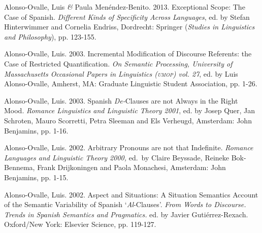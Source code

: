 \documentclass[11pt]{article}
\begin{document}
Alonso-Ovalle, Luis \textit{\&} Paula Men\'endez-Benito. 2013. Exceptional Scope: The Case of Spanish. \textit{Different Kinds of Specificity Across Languages}, ed. by
Stefan Hinterwimmer and Cornelia Endriss, Dordrecht: Springer
(\textit{Studies in Linguistics and Philosophy}), pp. 123-155.

Alonso-Ovalle, Luis. 2003. Incremental Modification of Discourse Referents: the Case of Restricted Quantification. \textit{On Semantic Processing, University of Massachusetts Occasional Papers in Linguistics (\textsc{umop}) vol. 27}, ed. by Luis Alonso-Ovalle, Amherst, MA: Graduate Linguistic Student Association, pp. 1-26.

Alonso-Ovalle, Luis. 2003. Spanish {\it De-}Clauses are not Always in the Right Mood. {\it Romance Linguistics and Linguistic Theory 2001}, ed. by Josep Quer, Jan Schroten, Mauro Scorretti, Petra Sleeman and Els Verheugd, Amsterdam: John Benjamins, pp. 1-16. 

Alonso-Ovalle, Luis. 2002. Arbitrary Pronouns are not that Indefinite.  {\it Romance Languages and Linguistic Theory 2000,} ed.\ by Claire Beyssade, Reineke Bok-Bennema, Frank Drijkoningen and Paola Monachesi, Amsterdam: John Benjamins, pp. 1-15. 

Alonso-Ovalle, Luis. 2002. Aspect and Situations: A Situation Semantics Account of the Semantic Variability of Spanish `\emph{Al}-Clauses'. \textit{From Words to Discourse. Trends in Spanish Semantics and Pragmatics.} ed. by Javier Guti\'errez-Rexach. Oxford/New York: Elsevier Science, pp. 119-127. 
\end{document}
